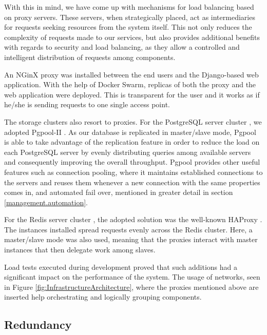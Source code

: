\documentclass[12pt]{article}
\begin{document}
With this in mind, we have come up with mechanisms for load balancing based on proxy servers.
These servers, when strategically placed, act as intermediaries for requests seeking resources from the system itself.
This not only reduces the complexity of requests made to our services, but also provides additional benefits with regards to security and load balancing,
as they allow a controlled and intelligent distribution of requests among components.

An NGinX proxy \cite{nginx} was installed between the end users and the Django-based web application.
With the help of Docker Swarm, replicas of both the proxy and the web application were deployed.
This is transparent for the user and it works as if he/she is sending requests to one single access point.

The storage clusters also resort to proxies.
For the PostgreSQL server cluster \cite{postgresql}, we adopted Pgpool-II \cite{pgpool}.
As our database is replicated in master/slave mode, Pgpool is able to take advantage of the replication feature in order to reduce the load on each PostgreSQL server
by evenly distributing queries among available servers and consequently improving the overall throughput.
Pgpool provides other useful features such as connection pooling, where it maintains established connections to the servers and reuses them whenever a new
connection with the same properties comes in, and automated fail over, mentioned in greater detail in section \ref{management.automation}.

For the Redis server cluster \cite{redis}, the adopted solution was the well-known HAProxy \cite{haproxy}.
The instances installed spread requests evenly across the Redis cluster.
Here, a master/slave mode was also used, meaning that the proxies interact with master instances that then delegate work among slaves.

Load tests executed during development proved that such additions had a significant impact on the performance of the system.
The usage of networks, seen in Figure \ref{fig:InfrastructureArchitecture}, where the proxies mentioned above are inserted help orchestrating and logically
grouping components.

\subsection{Redundancy} \label{architecture.redundancy} %

\end{document}
